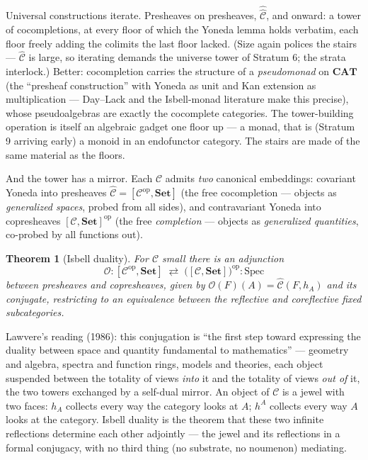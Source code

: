 \documentclass[11pt]{article}
\theoremstyle{plain}
\newtheorem{theorem}{Theorem}[section]
\theoremstyle{definition}
\theoremstyle{remark}
\newcommand{\C}{\mathcal{C}}
\newcommand{\Set}{\mathbf{Set}}
\newcommand{\CAT}{\mathbf{CAT}}
\newcommand{\op}{\mathrm{op}}
\begin{document}
Universal constructions iterate. Presheaves on presheaves, $\widehat{\widehat{\C}}$, and onward: a tower of cocompletions, at every floor of which the Yoneda lemma holds verbatim, each floor freely adding the colimits the last floor lacked. (Size again polices the stairs --- $\widehat{\C}$ is large, so iterating demands the universe tower of Stratum 6; the strata interlock.) Better: cocompletion carries the structure of a \emph{pseudomonad} on $\CAT$ (the ``presheaf construction'' with Yoneda as unit and Kan extension as multiplication --- Day--Lack and the Isbell-monad literature make this precise), whose pseudoalgebras are exactly the cocomplete categories. The tower-building operation is itself an algebraic gadget one floor up --- a monad, that is (Stratum 9 arriving early) a monoid in an endofunctor category. The stairs are made of the same material as the floors.

And the tower has a mirror. Each $\C$ admits \emph{two} canonical embeddings: covariant Yoneda into presheaves $\widehat{\C} = [\C^{\op},\Set]$ (the free cocompletion --- objects as \emph{generalized spaces}, probed from all sides), and contravariant Yoneda into copresheaves $[\C,\Set]^{\op}$ (the free \emph{completion} --- objects as \emph{generalized quantities}, co-probed by all functions out).

\begin{theorem}[Isbell duality]\label{thm:isbell}
For $\C$ small there is an adjunction
\[
\mathcal{O} \colon [\C^{\op},\Set] \;\rightleftarrows\; \bigl([\C,\Set]\bigr)^{\op} \colon \mathrm{Spec}
\]
between presheaves and copresheaves, given by $\mathcal{O}(F)(A) = \widehat{\C}(F, h_A)$ and its conjugate, restricting to an equivalence between the reflective and coreflective fixed subcategories.
\end{theorem}

Lawvere's reading (1986): this conjugation is ``the first step toward expressing the duality between space and quantity fundamental to mathematics'' --- geometry and algebra, spectra and function rings, models and theories, each object suspended between the totality of views \emph{into} it and the totality of views \emph{out of} it, the two towers exchanged by a self-dual mirror. An object of $\C$ is a jewel with two faces: $h_A$ collects every way the category looks at $A$; $h^A$ collects every way $A$ looks at the category. Isbell duality is the theorem that these two infinite reflections determine each other adjointly --- the jewel and its reflections in a formal conjugacy, with no third thing (no substrate, no noumenon) mediating.
\end{document}

